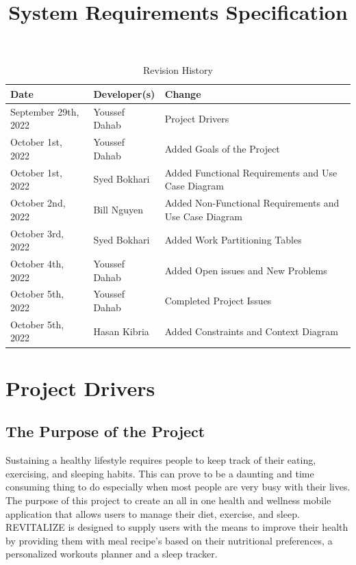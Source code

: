 \documentclass[12pt,letterpaper]{article}
\title{System Requirements Specification\\\progname}
\author{\authname}
\date{}
\begin{document}
\maketitle

\begin{table}[hp]
\caption{Revision History} \label{TblRevisionHistory}
\begin{tabularx}{\textwidth}{llX}
\toprule
\textbf{Date} & \textbf{Developer(s)} & \textbf{Change}\\
\midrule
September 29th, 2022 & Youssef Dahab & Project Drivers \\
October 1st, 2022 & Youssef Dahab & Added Goals of the Project \\
October 1st, 2022 & Syed Bokhari & Added Functional Requirements and Use Case Diagram \\
October 2nd, 2022 & Bill Nguyen & Added Non-Functional Requirements and Use Case Diagram \\
October 3rd, 2022 & Syed Bokhari & Added Work Partitioning Tables \\
October 4th, 2022 & Youssef Dahab & Added Open issues and New Problems \\
October 5th, 2022 & Youssef Dahab & Completed Project Issues \\
October 5th, 2022 & Hasan Kibria & Added Constraints and Context Diagram \\
\bottomrule
\end{tabularx}
\end{table}

\newpage
\tableofcontents
\newpage

\section{Project Drivers}

\subsection{The Purpose of the Project}
Sustaining a healthy lifestyle requires people to keep track of their eating, exercising, and sleeping habits. This can prove to be a daunting and time consuming thing to do especially when most people are very busy with their lives. The purpose of this project to create an all in one health and wellness mobile application that allows users to manage their diet, exercise, and sleep. REVITALIZE is designed to supply users with the means to improve their health by providing them with meal recipe's based on their nutritional preferences, a personalized workouts planner and a sleep tracker. 
\end{document}
